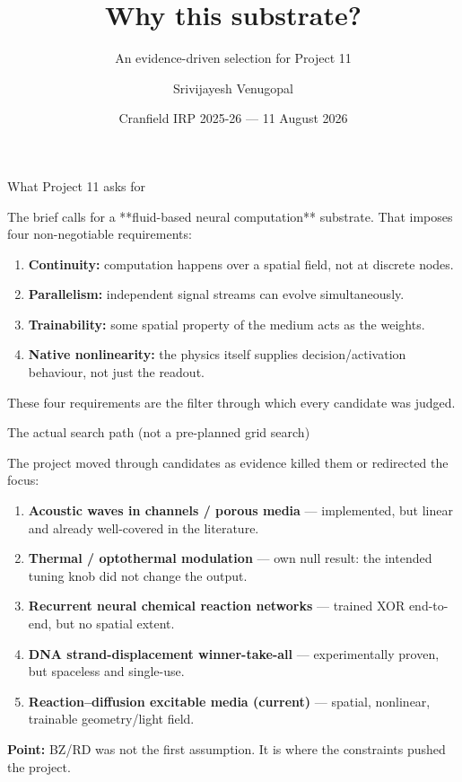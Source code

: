 \documentclass[aspectratio=169,11pt]{beamer}
\title{Why this substrate?}
\subtitle{An evidence-driven selection for Project 11}
\author{Srivijayesh Venugopal}
\date{Cranfield IRP 2025-26 --- 11 August 2026}
\begin{document}
\begin{frame}
\titlepage
\end{frame}

\begin{frame}{What Project 11 asks for}

The brief calls for a **fluid-based neural computation** substrate. That imposes four non-negotiable requirements:

\vspace{0.4cm}
\begin{enumerate}
    \item \textbf{Continuity:} computation happens over a spatial field, not at discrete nodes.
    \item \textbf{Parallelism:} independent signal streams can evolve simultaneously.
    \item \textbf{Trainability:} some spatial property of the medium acts as the weights.
    \item \textbf{Native nonlinearity:} the physics itself supplies decision/activation behaviour, not just the readout.
\end{enumerate}

\vspace{0.3cm}
These four requirements are the filter through which every candidate was judged.

\end{frame}

\begin{frame}{The actual search path (not a pre-planned grid search)}

The project moved through candidates as evidence killed them or redirected the focus:

\vspace{0.3cm}
\begin{enumerate}
    \item \textbf{Acoustic waves in channels / porous media} --- implemented, but linear and already well-covered in the literature.
    \item \textbf{Thermal / optothermal modulation} --- own null result: the intended tuning knob did not change the output.
    \item \textbf{Recurrent neural chemical reaction networks} --- trained XOR end-to-end, but no spatial extent.
    \item \textbf{DNA strand-displacement winner-take-all} --- experimentally proven, but spaceless and single-use.
    \item \textbf{Reaction--diffusion excitable media (current)} --- spatial, nonlinear, trainable geometry/light field.
\end{enumerate}

\vspace{0.3cm}
\textbf{Point:} BZ/RD was not the first assumption. It is where the constraints pushed the project.

\end{frame}
\end{document}

